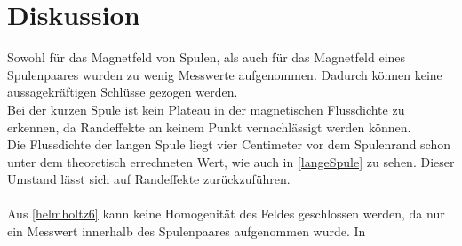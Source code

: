 \section{Diskussion}
\label{sec:Diskussion}

Sowohl für das Magnetfeld von Spulen, als auch für das Magnetfeld eines Spulenpaares wurden zu wenig Messwerte aufgenommen.
Dadurch können keine aussagekräftigen Schlüsse gezogen werden.\\
Bei der kurzen Spule ist kein Plateau in der magnetischen Flussdichte zu erkennen, da Randeffekte an keinem
Punkt vernachlässigt werden können. \\
Die Flussdichte der langen Spule liegt vier Centimeter vor dem Spulenrand schon unter dem theoretisch errechneten Wert, wie auch in
\autoref{langeSpule} zu sehen. Dieser Umstand lässt sich auf Randeffekte zurückzuführen.\\
\\
Aus \autoref{helmholtz6} kann keine Homogenität des Feldes geschlossen werden, da nur ein Messwert innerhalb des
Spulenpaares aufgenommen wurde. In 


\newpage